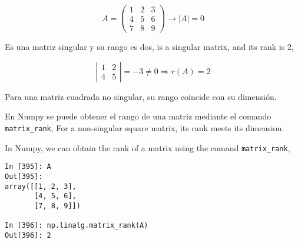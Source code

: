 \begin{equation*}
A=\begin{pmatrix}
1& 2& 3\\
4& 5& 6\\
7& 8& 9
\end{pmatrix} \rightarrow \vert A \vert =0
\end{equation*}
\begin{paracol}{2}
Es una matriz singular y su rango es dos,
\switchcolumn
is a singular matrix, and its rank is 2,    
\end{paracol}

\begin{equation*}
\left \vert \begin{matrix}
1& 2\\
4& 5
\end{matrix} \right \vert=-3 \neq 0 \Rightarrow r(A)=2
\end{equation*}
\begin{paracol}{2}
Para una matriz cuadrada no singular, su rango coincide con su dimensión.

En Numpy se puede obtener el rango de una  matriz mediante el comando \texttt{matrix_rank},
\switchcolumn
For a non-singular square matrix, its rank meets its dimension.

In Numpy, we can obtain the rank of a matrix using the comand \texttt{matrix_rank},  
\end{paracol}
\begin{center}
\begin{minipage}{0.5\textwidth}
\begin{verbatim}
In [395]: A
Out[395]: 
array([[1, 2, 3],
       [4, 5, 6],
       [7, 8, 9]])

In [396]: np.linalg.matrix_rank(A)
Out[396]: 2
\end{verbatim}
\end{minipage}
\end{center}
